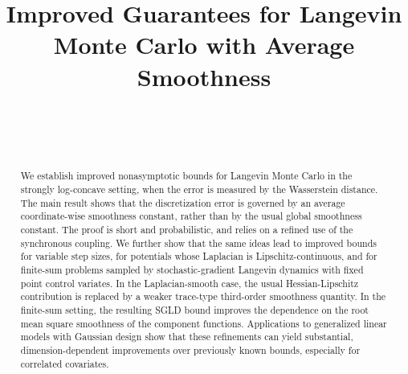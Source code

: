 \documentclass[aos,reqno]{imsart}
\theoremstyle{definition}
\begin{document}
\begin{frontmatter}

\title{Improved Guarantees for Langevin Monte Carlo with Average Smoothness}

\begin{aug}
\author[A]{~}

\author[B]{~}
\address[A]{CREST, ENSAE Paris, Institut Polytechnique de Paris and MBZUAI}
\address[B]{L2S, CNRS, Centrale Sup\'elec, Universit\'e Paris-Saclay}
\end{aug}

\begin{abstract}
We establish improved nonasymptotic bounds for Langevin 
Monte Carlo in the strongly log-concave setting, when 
the error is measured by the Wasserstein distance.  
The main result shows that the discretization error is governed by an average coordinate-wise smoothness
constant, rather than by the usual global smoothness
constant. The proof is short and probabilistic, and 
relies on a refined use of the synchronous coupling. 
We further show that the same ideas lead to improved
bounds for variable step sizes, for potentials whose
Laplacian is Lipschitz-continuous, and for finite-sum
problems sampled by stochastic-gradient Langevin dynamics
with fixed point control variates. In the Laplacian-smooth
case, the usual Hessian-Lipschitz contribution is replaced
by a weaker trace-type third-order smoothness quantity.
In the finite-sum setting, the resulting SGLD bound
improves the dependence on the root mean square smoothness
of the component functions. Applications to generalized
linear models with Gaussian design show that these
refinements can yield substantial, dimension-dependent
improvements over previously known bounds, especially for
correlated covariates.
\end{abstract}

\begin{keyword}[class=MSC]
\end{keyword}

\begin{keyword}
\end{keyword}

\end{frontmatter}
\end{document}
